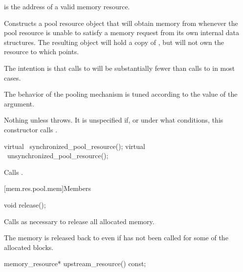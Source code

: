 \begin{itemdescr}
\pnum
\expects
{} is the address of a valid memory resource.

\pnum
\effects
Constructs a pool resource object that will obtain memory from 
whenever the pool resource is unable to satisfy a memory request
from its own internal data structures.
The resulting object will hold a copy of ,
but will not own the resource to which  points.
\begin{note}
The intention is that calls to 
will be substantially fewer than calls to 
in most cases.
\end{note}
The behavior of the pooling mechanism is tuned
according to the value of the  argument.

\pnum
\throws
Nothing unless  throws.
It is unspecified if, or under what conditions,
this constructor calls .
\end{itemdescr}

%
%
\begin{itemdecl}
virtual ~synchronized_pool_resource();
virtual ~unsynchronized_pool_resource();
\end{itemdecl}

\begin{itemdescr}
\pnum
\effects
Calls .
\end{itemdescr}

[mem.res.pool.mem]{Members}

%
\begin{itemdecl}
void release();
\end{itemdecl}

\begin{itemdescr}
\pnum
\effects
Calls  as necessary
to release all allocated memory.
\begin{note}
The memory is released back to 
even if  has not been called
for some of the allocated blocks.
\end{note}
\end{itemdescr}

%
%
\begin{itemdecl}
memory_resource* upstream_resource() const;
\end{itemdecl}

